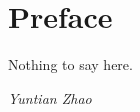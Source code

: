 \chapter*{Preface}

Nothing to say here.

\begin{flushright}
\textit{Yuntian Zhao}
\end{flushright}
